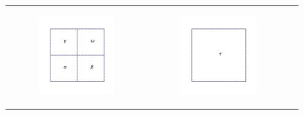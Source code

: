 \begin{figure}
\begin{tabular}{ccc}
\begin{subfigure}[t]{0.3\textwidth}
            \includegraphics[width=\textwidth, clip=true, trim={100 150 100 150}]{figures/four_patches_without_points.pdf}
            \label{subfig:4_patches}
        \end{subfigure}
        &
        \begin{subfigure}[t]{0.3\textwidth}
            \centering
            \includegraphics[width=\textwidth, clip=true, trim={100 150 100 150}]{figures/merged_patch.pdf}

\end{subfigure}
\end{tabular}
\end{figure}
